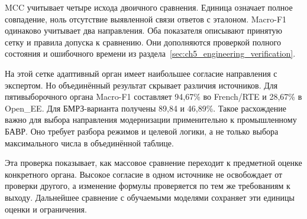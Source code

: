 {}

MCC учитывает четыре исхода двоичного сравнения.
Единица означает полное совпадение,
ноль отсутствие выявленной связи ответов с эталоном.
Macro-F1 одинаково учитывает два направления.
Оба показателя описывают принятую сетку
и правила допуска к сравнению.
Они дополняются проверкой полного состояния
и ошибочного времени из
раздела~\ref{sec:ch5_engineering_verification}.

На этой сетке адаптивный орган имеет
наибольшее согласие направления с экспертом.
Но объединённый результат скрывает различия источников.
Для пятивыборочного органа Macro-F1
составляет 94,67\% во French/RTE
и 28,67\% в Open\_EE.
Для БМРЗ-варианта получены 89,84 и 46,89\%.
Такое расхождение важно для выбора
направления модернизации применительно
к промышленному БАВР.
Оно требует разбора режимов и целевой логики,
а не только выбора максимального числа
в объединённой таблице.

Эта проверка показывает, как массовое сравнение
переходит к предметной оценке конкретного органа.
Высокое согласие в одном источнике
не освобождает от проверки другого,
а изменение формулы проверяется
по тем же требованиям к выходу.
Дальнейшее сравнение с обучаемыми моделями
сохраняет эти единицы оценки и ограничения.


